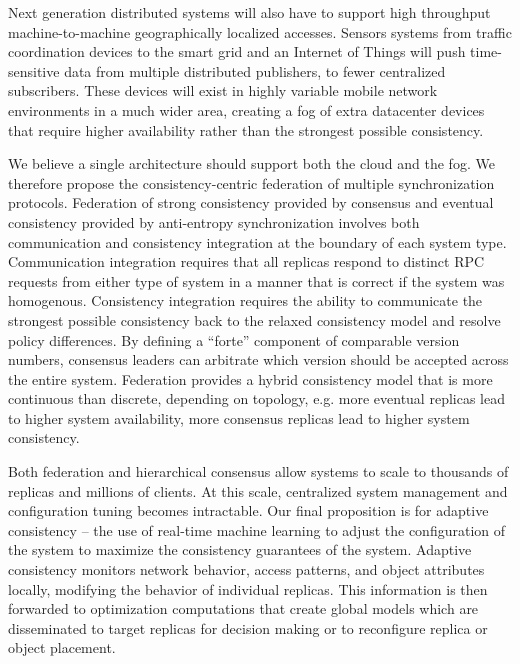 Next generation distributed systems will also have to support high throughput machine-to-machine geographically localized accesses.
Sensors systems from traffic coordination devices to the smart grid and an Internet of Things will push time-sensitive data from multiple distributed publishers, to fewer centralized subscribers.
These devices will exist in highly variable mobile network environments in a much wider area, creating a fog of extra datacenter devices that require higher availability rather than the strongest possible consistency.

We believe a single architecture should support both the cloud and the fog.
We therefore propose the consistency-centric federation of multiple synchronization protocols.
Federation of strong consistency provided by consensus and eventual consistency provided by anti-entropy synchronization involves both communication and consistency integration at the boundary of each system type.
Communication integration requires that all replicas respond to distinct RPC requests from either type of system in a manner that is correct if the system was homogenous.
Consistency integration requires the ability to communicate the strongest possible consistency back to the relaxed consistency model and resolve policy differences.
By defining a ``forte'' component of comparable version numbers, consensus leaders can arbitrate which version should be accepted across the entire system.
Federation provides a hybrid consistency model that is more continuous than discrete, depending on topology, e.g. more eventual replicas lead to higher system availability, more consensus replicas lead to higher system consistency.

Both federation and hierarchical consensus allow systems to scale to thousands of replicas and millions of clients.
At this scale, centralized system management and configuration tuning becomes intractable.
Our final proposition is for adaptive consistency -- the use of real-time machine learning to adjust the configuration of the system to maximize the consistency guarantees of the system.
Adaptive consistency monitors network behavior, access patterns, and object attributes locally, modifying the behavior of individual replicas.
This information is then forwarded to optimization computations that create global models which are disseminated to target replicas for decision making or to reconfigure replica or object placement.

